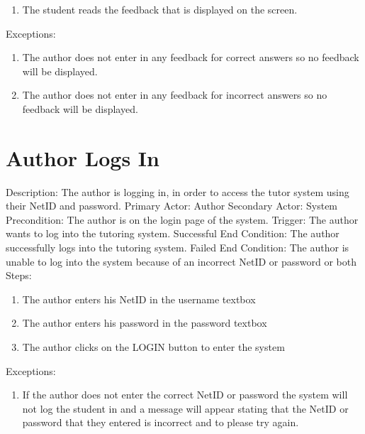 \begin{enumerate}
\begin{enumerate}
{            written by the author for an incorrect answer such as a hint or common mistake.}
            \item{The student reads the feedback that is displayed on the screen.}
        \end{enumerate}
        Exceptions:
        \begin{enumerate}
            \item{The author does not enter in any feedback for correct answers so no feedback will be displayed.}
            \item{The author does not enter in any feedback for incorrect answers so no feedback will be displayed.}
        \end{enumerate}
        
    \section{Author Logs In}
        Description: The author is logging in, in order to access the tutor system using their NetID and password. \newline
        Primary Actor: Author \newline
        Secondary Actor: System \newline
        Precondition: The author is on the login page of the system. \newline
        Trigger: The author wants to log into the tutoring system. \newline
        Successful End Condition: The author successfully logs into the tutoring system. \newline
        Failed End Condition:  The author is unable to log into the system because of an incorrect NetID or password or both \newline
        \newline
        Steps:
        \begin{enumerate}
            \item{The author enters his NetID in the username textbox}
            \item{The author enters his password in the password textbox}
            \item{The author clicks on the LOGIN button to enter the system}
        \end{enumerate}
        Exceptions:
        \begin{enumerate}
            \item{If the author does not enter the correct NetID or password 
            the system will not log the student in and a message will appear stating 
            that the NetID or password that they entered is incorrect and to please try again.}
        \end{enumerate}
    

\end{enumerate}
